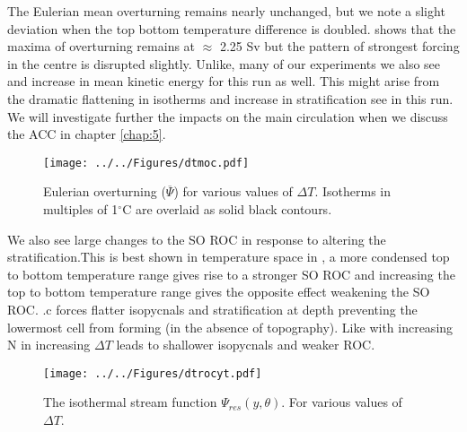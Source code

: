 The Eulerian mean overturning remains nearly unchanged, but we note a slight deviation when the top bottom temperature difference is doubled.  shows that the maxima of overturning remains at $\approx$ 2.25 Sv but the pattern of strongest forcing in the centre is disrupted slightly. Unlike, many of our experiments we also see and increase in mean kinetic energy for this run as well. This might arise from the dramatic flattening in isotherms and increase in stratification see in this run. We will investigate further the impacts on the main circulation when we discuss the ACC in chapter \ref{chap:5}.
\begin{figure}[H]
\center
\noindent \texttt{[image: ../../Figures/dtmoc.pdf]}
\caption{Eulerian overturning ($\overline{\Psi}$) for various values of $\Delta T$. Isotherms in multiples of 1$^{\circ}$C are overlaid as solid black contours.}
\label{fig:MOCdt}
\end{figure}
We also see large changes to the SO ROC in response to altering the stratification.This is best shown in temperature space in , a more condensed top to bottom temperature range gives rise to a stronger SO ROC and increasing the top to bottom temperature range gives the opposite effect weakening the SO ROC. .c forces flatter isopycnals and stratification at depth preventing the lowermost cell from forming (in the absence of topography). Like with increasing N in  increasing $\Delta T$ leads to shallower isopycnals and weaker ROC.
\begin{figure}[H]
\center
\noindent \texttt{[image: ../../Figures/dtrocyt.pdf]}
\caption{The isothermal stream function $\Psi_{res}(y,\theta)$. For various values of $\Delta T$.}
\label{fig:ROCTdt}
\end{figure}

